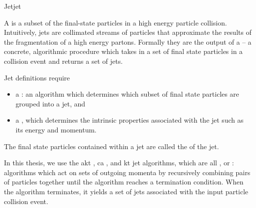 \begin{definitionbox}{Jet}{jet}



    A  is a subset of the final-state particles in a high energy particle collision.
    Intuitively, jets are collimated streams of particles that approximate the results of the fragmentation of a high energy partons.
    Formally they are the output of a  -- a concrete, algorithmic procedure which takes in a set of final state particles in a collision event and returns a set of jets.

    Jet definitions require
    \begin{itemize}
        \item
            a :
            an algorithm which determines which subset of final state particles are grouped into a jet, and

        \item
            a , which determines the intrinsic properties associated with the jet such as its energy and momentum.
    \end{itemize}

    The final state particles contained within a jet are called the  of the jet.
\end{definitionbox}


In this thesis, we use the \gls{akt} \cite{Cacciari:2008gp}, \gls{ca} \cite{Dokshitzer:1997in,Wobisch:1998wt}, and \gls{kt} \cite{Catani:1991hj,Catani:1993hr} jet algorithms, which are all , or :
%
algorithms which act on sets of outgoing momenta by recursively combining pairs of particles together until the algorithm reaches a termination condition.
%
When the algorithm terminates, it yields a set of jets associated with the input particle collision event.

